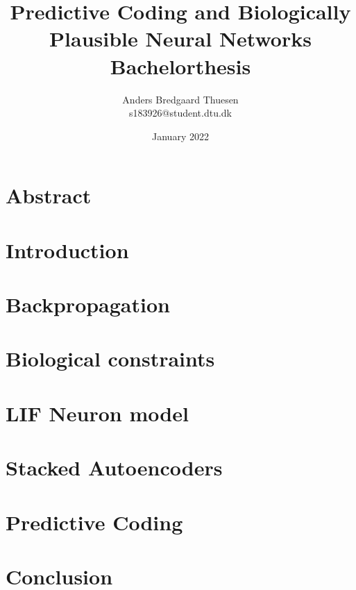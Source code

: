 \documentclass{article}
\title{
  Predictive Coding and Biologically Plausible Neural Networks \\
  \large{Bachelorthesis}
}
\author{Anders Bredgaard Thuesen \\ s183926@student.dtu.dk}
\date{January 2022}
\begin{document}
\maketitle

\section*{Abstract}

\newpage

\tableofcontents

\newpage

\section{Introduction}

\section{Backpropagation}

\section{Biological constraints}

\section{LIF Neuron model}


\section{Stacked Autoencoders}

\section{Predictive Coding}


\section{Conclusion}

\newpage


\end{document}
